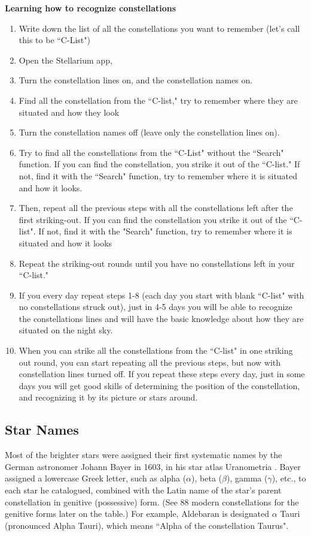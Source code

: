 \documentclass[a4paper,12pt]{extarticle}
\begin{document}
\textbf{Learning how to recognize constellations}

\begin{enumerate}[1.]
	\item Write down the list of all the constellations you want to remember (let's call this to be ``C-List")
	\item Open the Stellarium app,
	\item Turn the constellation lines on, and the constellation names on.
	\item Find all the constellation from the ``C-list," try to remember where they are situated and how they look
	\item Turn the constellation names off (leave only the constellation lines on).
	\item Try to find all the constellations from the ``C-List" without the ``Search" function. If you can find the constellation, you strike it out of the ``C-list." If not, find it with the ``Search" function, try to remember where it is situated and how it looks.
	\item Then, repeat all the previous steps with all the constellations left after the first striking-out. If you can find the constellation you strike it out of the ``C-list". If not, find it with the "Search" function, try to remember where it is situated and how it looks
	\item Repeat the striking-out rounds until you have no constellations left in your ``C-list."
	\item If you every day repeat steps 1-8 (each day you start with blank ``C-list" with no constellations struck out), just in 4-5 days you will be able to recognize the constellations lines and will have the basic knowledge about how they are situated on the night sky.
	\item When you can strike all the constellations from the ``C-list" in one striking out round, you can start repeating all the previous steps, but now with constellation lines turned off. If you repeat these steps every day, just in some days you will get good skills of determining the position of the constellation, and recognizing it by its picture or stars around.
	
\end{enumerate}

\subsection{Star Names}

Most of the brighter stars were assigned their first systematic names by the German astronomer Johann Bayer in 1603, in his star atlas Uranometria . Bayer assigned a lowercase Greek letter, such as alpha ($\alpha$), beta ($\beta$), gamma ($\gamma$), etc., to each star he catalogued, combined with the Latin name of the star’s parent constellation in genitive (possessive) form. (See 88 modern constellations for the genitive forms later on the table.) For example, Aldebaran is designated $\alpha$ Tauri (pronounced Alpha Tauri), which means ``Alpha of the constellation Taurus".\\
\end{document}
